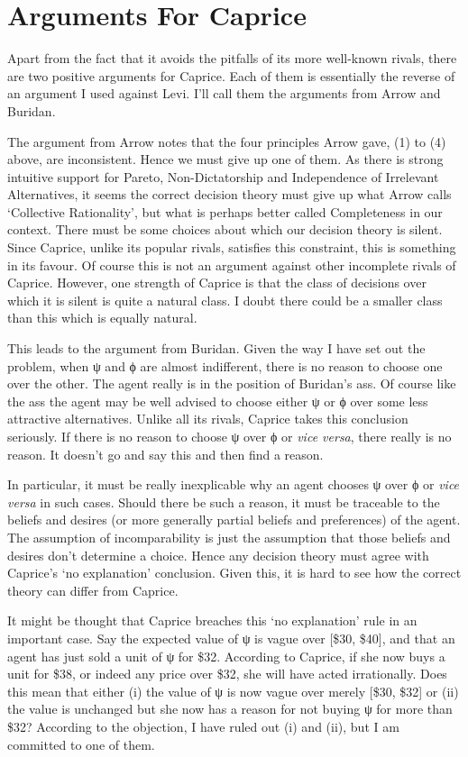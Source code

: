 \documentclass[
  10pt,
  letterpaper,
  DIV=11,
  numbers=noendperiod,
  twoside]{scrartcl}
\begin{document}
\section{Arguments For Caprice}\label{arguments-for-caprice}

Apart from the fact that it avoids the pitfalls of its more well-known
rivals, there are two positive arguments for Caprice. Each of them is
essentially the reverse of an argument I used against Levi. I'll call
them the arguments from Arrow and Buridan.

The argument from Arrow notes that the four principles Arrow gave, (1)
to (4) above, are inconsistent. Hence we must give up one of them. As
there is strong intuitive support for Pareto, Non-Dictatorship and
Independence of Irrelevant Alternatives, it seems the correct decision
theory must give up what Arrow calls `Collective Rationality', but what
is perhaps better called Completeness in our context. There must be some
choices about which our decision theory is silent. Since Caprice, unlike
its popular rivals, satisfies this constraint, this is something in its
favour. Of course this is not an argument against other incomplete
rivals of Caprice. However, one strength of Caprice is that the class of
decisions over which it is silent is quite a natural class. I doubt
there could be a smaller class than this which is equally natural.

This leads to the argument from Buridan. Given the way I have set out
the problem, when ψ and ϕ are almost indifferent, there is no reason to
choose one over the other. The agent really is in the position of
Buridan's ass. Of course like the ass the agent may be well advised to
choose either ψ or ϕ over some less attractive alternatives. Unlike all
its rivals, Caprice takes this conclusion seriously. If there is no
reason to choose ψ over ϕ or \emph{vice versa}, there really is no
reason. It doesn't go and say this and then find a reason.

In particular, it must be really inexplicable why an agent chooses ψ
over ϕ or \emph{vice versa} in such cases. Should there be such a
reason, it must be traceable to the beliefs and desires (or more
generally partial beliefs and preferences) of the agent. The assumption
of incomparability is just the assumption that those beliefs and desires
don't determine a choice. Hence any decision theory must agree with
Caprice's `no explanation' conclusion. Given this, it is hard to see how
the correct theory can differ from Caprice.

It might be thought that Caprice breaches this `no explanation' rule in
an important case. Say the expected value of ψ is vague over {[}\$30,
\$40{]}, and that an agent has just sold a unit of ψ for \$32. According
to Caprice, if she now buys a unit for \$38, or indeed any price over
\$32, she will have acted irrationally. Does this mean that either (i)
the value of ψ is now vague over merely {[}\$30, \$32{]} or (ii) the
value is unchanged but she now has a reason for not buying ψ for more
than \$32? According to the objection, I have ruled out (i) and (ii),
but I am committed to one of them.
\end{document}
